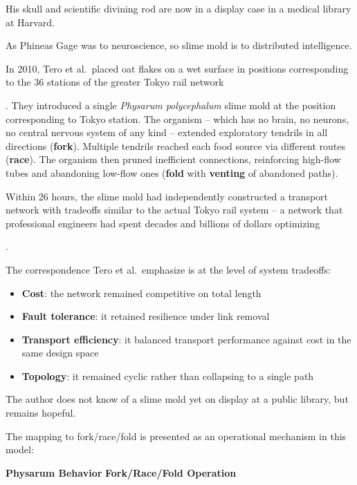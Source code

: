 \documentclass[
]{article}
\providecommand{\tightlist}{%
  \setlength{\itemsep}{0pt}\setlength{\parskip}{0pt}}
\begin{document}
His skull and scientific divining rod are now in a display case in a
medical library at Harvard.

As Phineas Gage was to neuroscience, so slime mold is to distributed
intelligence.

In 2010, Tero et al.~placed oat flakes on a wet surface in positions
corresponding to the 36 stations of the greater Tokyo rail network

. They introduced a single \emph{Physarum polycephalum} slime mold at
the position corresponding to Tokyo station. The organism -- which has
no brain, no neurons, no central nervous system of any kind -- extended
exploratory tendrils in all directions (\textbf{fork}). Multiple
tendrils reached each food source via different routes (\textbf{race}).
The organism then pruned inefficient connections, reinforcing high-flow
tubes and abandoning low-flow ones (\textbf{fold} with \textbf{venting}
of abandoned paths).

Within 26 hours, the slime mold had independently constructed a
transport network with tradeoffs similar to the actual Tokyo rail system
-- a network that professional engineers had spent decades and billions
of dollars optimizing

.

The correspondence Tero et al.~emphasize is at the level of system
tradeoffs:

\begin{itemize}
\tightlist
\item
  \textbf{Cost}: the network remained competitive on total length\\
\item
  \textbf{Fault tolerance}: it retained resilience under link removal\\
\item
  \textbf{Transport efficiency}: it balanced transport performance
  against cost in the same design space\\
\item
  \textbf{Topology}: it remained cyclic rather than collapsing to a
  single path
\end{itemize}

The author does not know of a slime mold yet on display at a public
library, but remains hopeful.

The mapping to fork/race/fold is presented as an operational mechanism
in this model:

\textbf{Physarum Behavior} \textbar{} \textbf{Fork/Race/Fold Operation}
\textbar{}
\end{document}
